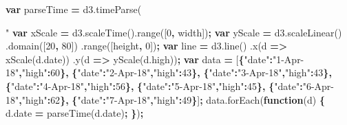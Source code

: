 \documentclass[openany]{book}
\newenvironment{Shaded}{\begin{snugshade}}{\end{snugshade}}
\newcommand{\AttributeTok}[1]{\textcolor[rgb]{0.77,0.63,0.00}{#1}}
\newcommand{\DecValTok}[1]{\textcolor[rgb]{0.00,0.00,0.81}{#1}}
\newcommand{\KeywordTok}[1]{\textcolor[rgb]{0.13,0.29,0.53}{\textbf{#1}}}
\newcommand{\NormalTok}[1]{#1}
\newcommand{\OperatorTok}[1]{\textcolor[rgb]{0.81,0.36,0.00}{\textbf{#1}}}
\newcommand{\StringTok}[1]{\textcolor[rgb]{0.31,0.60,0.02}{#1}}
\newcommand{\VariableTok}[1]{\textcolor[rgb]{0.00,0.00,0.00}{#1}}
\begin{document}
\begin{Shaded}
\begin{Highlighting}[]
      \KeywordTok{var}\NormalTok{ parseTime }\OperatorTok{=} \VariableTok{d3}\NormalTok{.}\AttributeTok{timeParse}\NormalTok{(}\StringTok{"%
      \KeywordTok{var}\NormalTok{ xScale }\OperatorTok{=} \VariableTok{d3}\NormalTok{.}\AttributeTok{scaleTime}\NormalTok{().}\AttributeTok{range}\NormalTok{([}\DecValTok{0}\OperatorTok{,}\NormalTok{ width])}\OperatorTok{;}
      \KeywordTok{var}\NormalTok{ yScale }\OperatorTok{=} \VariableTok{d3}\NormalTok{.}\AttributeTok{scaleLinear}\NormalTok{()}
\NormalTok{        .}\AttributeTok{domain}\NormalTok{([}\DecValTok{20}\OperatorTok{,} \DecValTok{80}\NormalTok{])}
\NormalTok{        .}\AttributeTok{range}\NormalTok{([height}\OperatorTok{,} \DecValTok{0}\NormalTok{])}\OperatorTok{;}
      \KeywordTok{var}\NormalTok{ line }\OperatorTok{=} \VariableTok{d3}\NormalTok{.}\AttributeTok{line}\NormalTok{()}
\NormalTok{        .}\AttributeTok{x}\NormalTok{(d }\OperatorTok{=>} \AttributeTok{xScale}\NormalTok{(}\VariableTok{d}\NormalTok{.}\AttributeTok{date}\NormalTok{))}
\NormalTok{        .}\AttributeTok{y}\NormalTok{(d }\OperatorTok{=>} \AttributeTok{yScale}\NormalTok{(}\VariableTok{d}\NormalTok{.}\AttributeTok{high}\NormalTok{))}\OperatorTok{;}
      \KeywordTok{var}\NormalTok{ data }\OperatorTok{=} 
\NormalTok{      [}\OperatorTok{\{}\StringTok{"date"}\OperatorTok{:}\StringTok{"1-Apr-18"}\OperatorTok{,}\StringTok{"high"}\OperatorTok{:}\DecValTok{60}\OperatorTok{\},}
      \OperatorTok{\{}\StringTok{"date"}\OperatorTok{:}\StringTok{"2-Apr-18"}\OperatorTok{,}\StringTok{"high"}\OperatorTok{:}\DecValTok{43}\OperatorTok{\},}
      \OperatorTok{\{}\StringTok{"date"}\OperatorTok{:}\StringTok{"3-Apr-18"}\OperatorTok{,}\StringTok{"high"}\OperatorTok{:}\DecValTok{43}\OperatorTok{\},}
      \OperatorTok{\{}\StringTok{"date"}\OperatorTok{:}\StringTok{"4-Apr-18"}\OperatorTok{,}\StringTok{"high"}\OperatorTok{:}\DecValTok{56}\OperatorTok{\},}
      \OperatorTok{\{}\StringTok{"date"}\OperatorTok{:}\StringTok{"5-Apr-18"}\OperatorTok{,}\StringTok{"high"}\OperatorTok{:}\DecValTok{45}\OperatorTok{\},}
      \OperatorTok{\{}\StringTok{"date"}\OperatorTok{:}\StringTok{"6-Apr-18"}\OperatorTok{,}\StringTok{"high"}\OperatorTok{:}\DecValTok{62}\OperatorTok{\},}
      \OperatorTok{\{}\StringTok{"date"}\OperatorTok{:}\StringTok{"7-Apr-18"}\OperatorTok{,}\StringTok{"high"}\OperatorTok{:}\DecValTok{49}\OperatorTok{\}}\NormalTok{]}\OperatorTok{;}
      \VariableTok{data}\NormalTok{.}\AttributeTok{forEach}\NormalTok{(}\KeywordTok{function}\NormalTok{(d) }\OperatorTok{\{}
            \VariableTok{d}\NormalTok{.}\AttributeTok{date} \OperatorTok{=} \AttributeTok{parseTime}\NormalTok{(}\VariableTok{d}\NormalTok{.}\AttributeTok{date}\NormalTok{)}\OperatorTok{;}
      \OperatorTok{\}}\NormalTok{)}\OperatorTok{;}
     
}
\end{Highlighting}
\end{Shaded}
\end{document}
